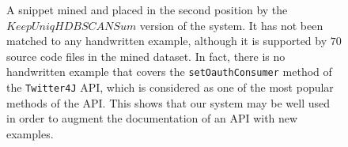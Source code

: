 \begin{figure}[!h]

\vspace{-10pt}
\caption[Mined snippet not matched to any handwritten example]{A snippet mined and placed in the second position by the $KeepUniqHDBSCANSum$ version of the system. It has not been matched to any handwritten example, although it is supported by $70$ source code files in the mined dataset. In fact, there is no handwritten example that covers the \texttt{setOauthConsumer} method of the \texttt{Twitter4J} API, which is considered as one of the most popular methods of the API. This shows that our system may be well used in order to augment the documentation of an API with new examples.}
\label{listings:exp5-not-matched-hdbscan}
\end{figure}
